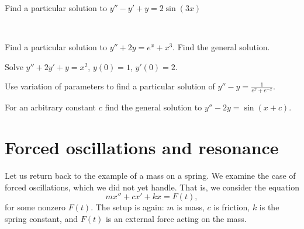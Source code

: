 \setcounter{exercise}{100}

\begin{exercise}
Find a particular solution to $y''-y'+y=2\sin(3x)$
\end{exercise}

\begin{samepage}
\begin{exercise}
{\ }
\begin{tasks}
\task Find a particular solution to $y''+2y=e^x + x^3$.
\task Find the general solution.
\end{tasks}
\end{exercise}
\end{samepage}

\begin{exercise}
Solve $y''+2y'+y = x^2$, $y(0)=1$, $y'(0)=2$.
\end{exercise}

\begin{exercise}
Use variation of parameters to
find a particular solution of $y''-y = \frac{1}{e^x+e^{-x}}$.
\end{exercise}

\begin{exercise}
For an arbitrary constant $c$ find the general solution
to $y''-2y=\sin(x+c)$.
\end{exercise}




\sectionnewpage
\section{Forced oscillations and resonance} \label{forcedo:section}


\begin{mywrapfigsimp}{2.0in}{2.3in}
\noindent
{}
\end{mywrapfigsimp}
Let us return back to the example of a mass on a spring.  We examine
the case of forced oscillations, which we did not yet handle.  That is, we consider the equation
\begin{equation*}
mx'' + cx' + kx = F(t) ,
\end{equation*}
for some nonzero $F(t)$.  The setup
is again: $m$ is mass, $c$ is friction, $k$ is the spring constant, and
$F(t)$ is an external force acting on the mass.

